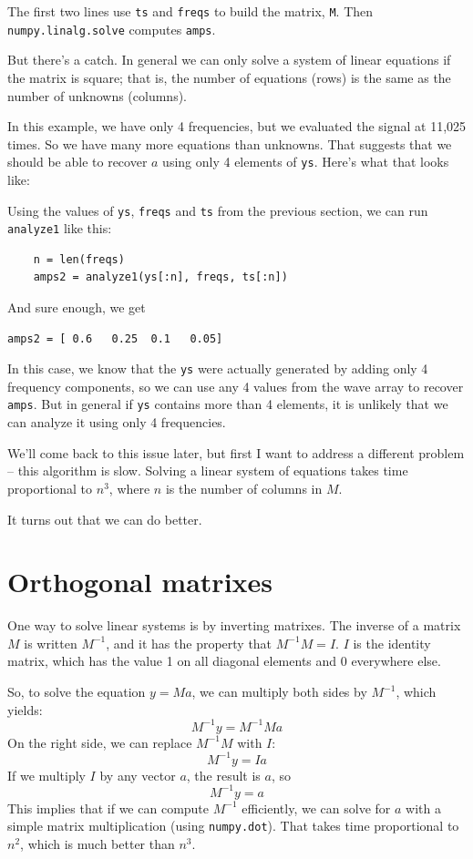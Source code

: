 \documentclass[12pt]{book}
\begin{document}
The first two lines use {\tt ts} and {\tt freqs} to build the
matrix, {\tt M}.  Then {\tt numpy.linalg.solve} computes {\tt amps}.

But there's a catch.  In general we can only solve a system of linear
equations if the matrix is square; that is, the number of equations
(rows) is the same as the number of unknowns (columns).

In this example, we have only 4 frequencies, but we evaluated the
signal at 11,025 times.  So we have many more equations than unknowns.
That suggests that we should be able to recover $a$ using only
4 elements of {\tt ys}.  Here's what that looks like:

Using the values of {\tt ys}, {\tt freqs} and {\tt ts} from
the previous section, we can run {\tt analyze1} like this:

\begin{verbatim}
    n = len(freqs)
    amps2 = analyze1(ys[:n], freqs, ts[:n])
\end{verbatim}

And sure enough, we get

\begin{verbatim}
amps2 = [ 0.6   0.25  0.1   0.05]
\end{verbatim}

In this case, we know that the {\tt ys} were actually generated by
adding only 4 frequency components, so we can use any 4 values from
the wave array to recover {\tt amps}.  But in general if {\tt ys}
contains more than 4 elements, it is unlikely that we can analyze it
using only 4 frequencies.

We'll come back to this issue later, but first I want to address
a different problem -- this algorithm is slow.  Solving a linear
system of equations takes time proportional to $n^3$, where $n$ is
the number of columns in $M$.

It turns out that we can do better.


\section{Orthogonal matrixes}

One way to solve linear systems is by inverting matrixes.  The
inverse of a matrix $M$ is written $M^{-1}$, and it has the property
that $M^{-1}M = I$.  $I$ is the identity matrix, which has
the value 1 on all diagonal elements and 0 everywhere else.

So, to solve the equation $y = Ma$, we can multiply both sides by
$M^{-1}$, which yields:
%
\[ M^{-1}y = M^{-1} M a \]
%
On the right side, we can replace $M^{-1}M$ with $I$:
%
\[ M^{-1}y = I a \]
%
If we multiply $I$ by any vector $a$, the result is $a$, so  
%
\[ M^{-1}y = a \]
%
This implies that if we can compute $M^{-1}$ efficiently, we can solve
for $a$ with a simple matrix multiplication (using {\tt numpy.dot}).
That takes time proportional to $n^2$, which is much better than
$n^3$.
\end{document}
